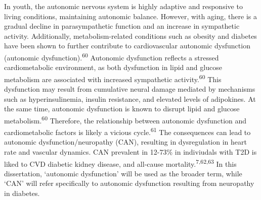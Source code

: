 \documentclass[
  a4paper,
  headsepline=true,
  open=left]{scrbook}
\begin{document}
In youth, the autonomic nervous system is highly adaptive and responsive
to living conditions, maintaining autonomic balance. However, with
aging, there is a gradual decline in parasympathetic function and an
increase in sympathetic activity. Additionally, metabolism-related
conditions such as obesity and diabetes have been shown to further
contribute to cardiovascular autonomic dysfunction (autonomic
dysfunction).\textsuperscript{60} Autonomic dysfunction reflects a
stressed cardiometabolic environment, as both dysfunction in lipid and
glucose metabolism are associated with increased sympathetic
activity.\textsuperscript{60} This dysfunction may result from
cumulative neural damage mediated by mechanisms such as
hyperinsulinemia, insulin resistance, and elevated levels of adipokines.
At the same time, autonomic dysfunction is known to disrupt lipid and
glucose metabolism.\textsuperscript{60} Therefore, the relationship
between autonomic dysfunction and cardiometabolic factors is likely a
vicious cycle.\textsuperscript{61} The consequences can lead to
autonomic dysfunction/neuropathy (CAN), resulting in dysregulation in
heart rate and vascular dynamics. CAN prevalent in 12-73\% in
indiviudals with T2D is liked to CVD diabetic kidney disease, and
all-cause mortality.\textsuperscript{7,62,63} In this dissertation,
`autonomic dysfunction' will be used as the broader term, while `CAN'
will refer specifically to autonomic dysfunction resulting from
neuropathy in diabetes.
\end{document}
